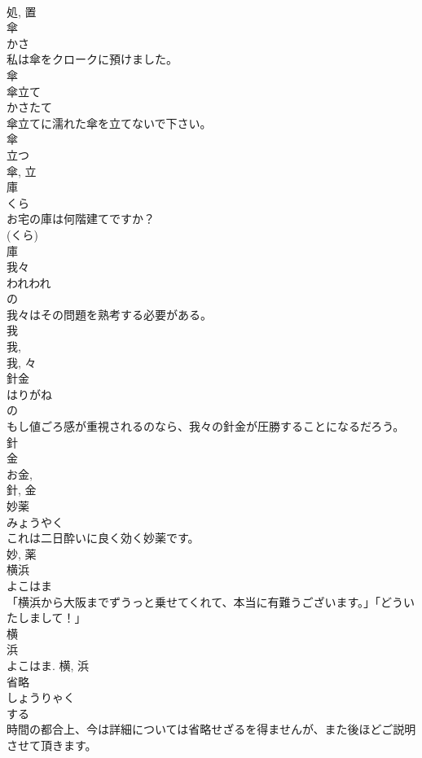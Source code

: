 \documentclass[8pt]{extreport}
\begin{document}
\begin{CJK}{UTF8}{min}
\\	処, 置	
\\	傘	
\\	かさ	
\\	私は傘をクロークに預けました。	
\\	傘	
\\	傘立て	
\\	かさたて	
\\	傘立てに濡れた傘を立てないで下さい。	
\\	傘 
\\	立つ 
\\	傘, 立	
\\	庫	
\\	くら	
\\	お宅の庫は何階建てですか？	
\\	(くら) 
\\	庫	
\\	我々	
\\	われわれ	
\\	の 
\\	我々はその問題を熟考する必要がある。	
\\	我 
\\	我, 
\\	我, 々	
\\	針金	
\\	はりがね	
\\	の 
\\	もし値ごろ感が重視されるのなら、我々の針金が圧勝することになるだろう。	
\\	針 
\\	金 
\\	お金, 
\\	針, 金	
\\	妙薬	
\\	みょうやく	
\\	これは二日酔いに良く効く妙薬です。	
\\	妙, 薬	
\\	横浜	
\\	よこはま	
\\	「横浜から大阪までずうっと乗せてくれて、本当に有難うございます。」「どういたしまして！」	
\\	横 
\\	浜 
\\	よこはま.	横, 浜	
\\	省略	
\\	しょうりゃく	
\\	する 
\\	時間の都合上、今は詳細については省略せざるを得ませんが、また後ほどご説明させて頂きます。	

\end{CJK}
\end{document}
